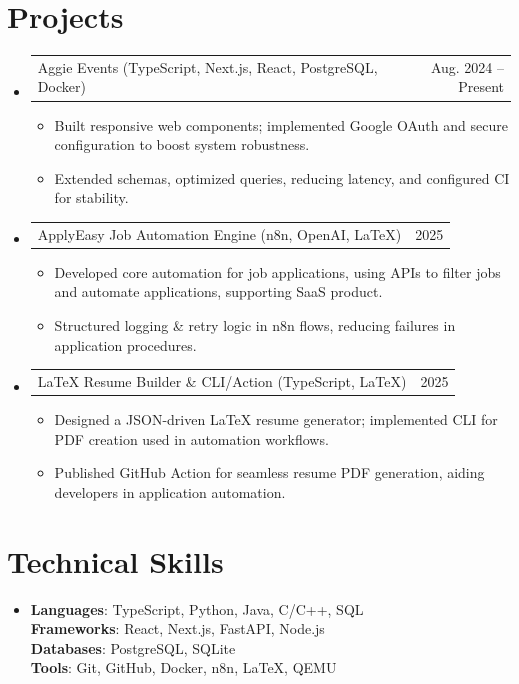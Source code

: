 \documentclass[letterpaper,11pt]{article}
\makeatletter
\newcommand{\resumeItem}[1]{
\item\small{{#1 \vspace{-2pt}}}
}
\newcommand{\resumeProjectHeading}[2]{
\item
\begin{tabular*}{0.97\textwidth}{l@{\extracolsep{\fill}}r}
\small#1 & #2 \\
\end{tabular*}\vspace{-7pt}
}
\newcommand{\resumeSubHeadingListStart}{\begin{itemize}[leftmargin=0.15in, label={}]}
\newcommand{\resumeSubHeadingListEnd}{\end{itemize}}
\newcommand{\resumeItemListStart}{\begin{itemize}}
\newcommand{\resumeItemListEnd}{\end{itemize}\vspace{-5pt}}
\makeatother
\begin{document}
\section{Projects}
\resumeSubHeadingListStart
\resumeProjectHeading
{Aggie Events (TypeScript, Next.js, React, PostgreSQL, Docker)}{Aug. 2024 -- Present}
\resumeItemListStart
\resumeItem{Built responsive web components; implemented Google OAuth and secure configuration to boost system robustness.}
\resumeItem{Extended schemas, optimized queries, reducing latency, and configured CI for stability.}
\resumeItemListEnd

\resumeProjectHeading
{ApplyEasy Job Automation Engine (n8n, OpenAI, LaTeX)}{2025}
\resumeItemListStart
\resumeItem{Developed core automation for job applications, using APIs to filter jobs and automate applications, supporting SaaS product.}
\resumeItem{Structured logging \& retry logic in n8n flows, reducing failures in application procedures.}
\resumeItemListEnd

\resumeProjectHeading
{LaTeX Resume Builder \& CLI/Action (TypeScript, LaTeX)}{2025}
\resumeItemListStart
\resumeItem{Designed a JSON-driven LaTeX resume generator; implemented CLI for PDF creation used in automation workflows.}
\resumeItem{Published GitHub Action for seamless resume PDF generation, aiding developers in application automation.}
\resumeItemListEnd
\resumeSubHeadingListEnd

\section{Technical Skills}
\resumeSubHeadingListStart
\item\small{
    \textbf{Languages}: TypeScript, Python, Java, C/C++, SQL \\
    \textbf{Frameworks}: React, Next.js, FastAPI, Node.js \\
    \textbf{Databases}: PostgreSQL, SQLite \\
    \textbf{Tools}: Git, GitHub, Docker, n8n, LaTeX, QEMU \\
}
\resumeSubHeadingListEnd
\end{document}
